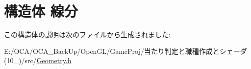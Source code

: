 \hypertarget{struct_xE7_xB7_x9A_xE5_x88_x86}{\section{構造体 線分}
\label{struct_xE7_xB7_x9A_xE5_x88_x86}
}


この構造体の説明は次のファイルから生成されました\-:\begin{DoxyCompactItemize}
\item 
E\-:/\-O\-C\-A/\-O\-C\-A\-\_\-\-Back\-Up/\-Open\-G\-L/\-Game\-Proj/当たり判定と職種作成とシェーダ(10\-\_)/src/\hyperlink{_geometry_8h}{Geometry.\-h}\end{DoxyCompactItemize}
